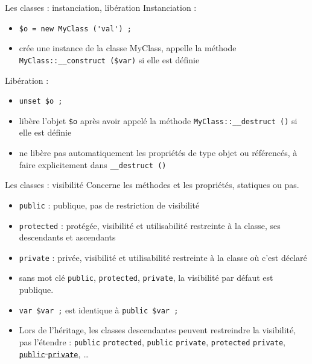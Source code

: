 \begin{frame}[containsverbatim]{Les classes : instanciation, libération}
	Instanciation : 
	\begin{itemize}
		\item \lstinline!$o = new MyClass ('val') ;!
		\item crée une instance de la classe MyClass, appelle la méthode \lstinline!MyClass::__construct ($var)! si elle est définie
	\end{itemize}
	Libération :
	\begin{itemize}
		\item \lstinline!unset $o ;!
		\item libère l'objet \lstinline!$o! après avoir appelé la méthode \lstinline!MyClass::__destruct ()! si elle est définie
		\item ne libère pas automatiquement les propriétés de type objet ou référencés, à faire explicitement dans \lstinline!__destruct ()!
	\end{itemize}
\end{frame}

\begin{frame}[containsverbatim]{Les classes : visibilité}
	Concerne les méthodes et les propriétés, statiques ou pas.
	\begin{itemize}
		\item \texttt{public} : publique, pas de restriction de visibilité
		\item \texttt{protected} : protégée, visibilité et utilisabilité restreinte à la classe, ses descendants et ascendants
		\item \texttt{private} : privée, visibilité et utilisabilité restreinte à la classe où c'est déclaré 
		\item sans mot clé \texttt{public}, \texttt{protected}, \texttt{private}, la visibilité par défaut est publique.
		\item \lstinline!var $var ;! est identique à \lstinline!public $var ;!
		\item Lors de l'héritage, les classes descendantes peuvent restreindre la visibilité, pas l'étendre : \texttt{public} \textrightarrow \texttt{protected}, \texttt{public} \textrightarrow \texttt{private}, \texttt{protected} \textrightarrow \texttt{private}, \sout{\texttt{public} \textleftarrow \texttt{private}}, \ldots
	\end{itemize}
\end{frame}

